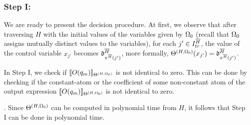 \subsubsection{Step I:} 
We are ready to present the decision procedure. At first, we observe that  after traversing $H$ with the initial values of the variables given by $\Omega_0$ (recall that $\Omega_0$ assigns mutually distinct values to the variables), for each $j' \in I^{\overline{H}}_{tr}$, the value of the control variable $x_{j'}$ becomes $\mathfrak{d}^{\overline{H}}_{\pi^{\overline{H}}(j')}$,  more formally, $\Theta^{(H,\Omega_0)}(x_{j'})=\mathfrak{d}^{\overline{H}}_{\pi^{\overline{H}}(j')}$.

In Step I, we check if $\llbracket O(q_m)\rrbracket_{\Theta^{(H,\Omega_0)}}$ is not identical to zero.
This can be done by checking if the constant-atom or the coefficient of some non-constant atom of the output expression $\llbracket O(q_m)\rrbracket_{\Theta^{(H,\Omega_0)}}$ is not identical to zero.
%
\medskip\\
\medskip

. Since $\Theta^{(H,\Omega_0)}$ can be computed in polynomial time from $H$, it follows that Step I can be done in polynomial time.

